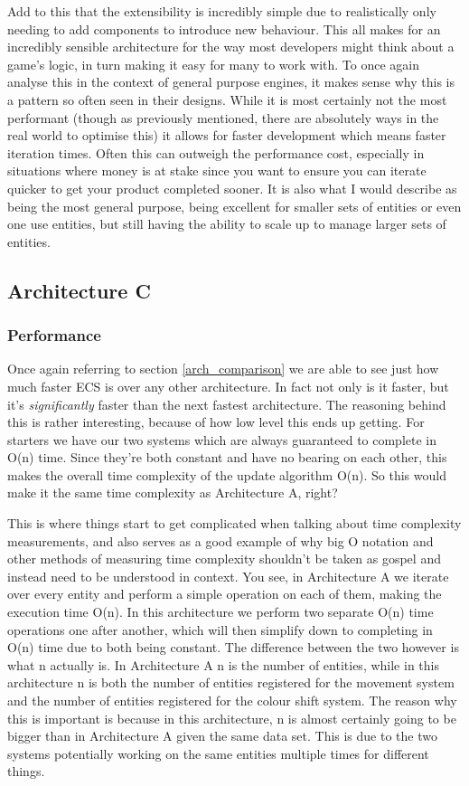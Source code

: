 \documentclass{article}
\begin{document}
Add to this that the extensibility is incredibly simple due to realistically
only needing to add components to introduce new behaviour. This all makes for
an incredibly sensible architecture for the way most developers might think
about a game's logic, in turn making it easy for many to work with. To once
again analyse this in the context of general purpose engines, it makes sense
why this is a pattern so often seen in their designs. While it is most certainly
not the most performant (though as previously mentioned, there are absolutely
ways in the real world to optimise this) it allows for faster development which
means faster iteration times. Often this can outweigh the performance cost,
especially in situations where money is at stake since you want to ensure you
can iterate quicker to get your product completed sooner. It is also what I
would describe as being the most general purpose, being excellent for smaller
sets of entities or even one use entities, but still having the ability to scale
up to manage larger sets of entities.

\subsection{Architecture C}
\subsubsection{Performance}
Once again referring to section \ref{arch_comparison} we are able to see just
how much faster ECS is over any other architecture. In fact not only is it
faster, but it's \textit{significantly} faster than the next fastest
architecture. The reasoning behind this is rather interesting, because of how
low level this ends up getting. For starters we have our two systems which are
always guaranteed to complete in O(n) time. Since they're both constant
and have no bearing on each other, this makes the overall time complexity of
the update algorithm O(n). So this would make it the same time complexity as
Architecture A, right?

This is where things start to get complicated when talking about time
complexity measurements, and also serves as a good example of why big O notation
and other methods of measuring time complexity shouldn't be taken as gospel and
instead need to be understood in context. You see, in Architecture A we iterate
over every entity and perform a simple operation on each of them, making the
execution time O(n). In this architecture we perform two separate O(n) time
operations one after another, which will then simplify down to completing in
O(n) time due to both being constant. The difference between the two however is
what n actually is. In Architecture A n is the number of entities, while in this
architecture n is both the number of entities registered for the movement system
and the number of entities registered for the colour shift system. The reason
why this is important is because in this architecture, n is almost certainly
going to be bigger than in Architecture A given the same data set. This is due
to the two systems potentially working on the same entities multiple times for
different things.
\end{document}
